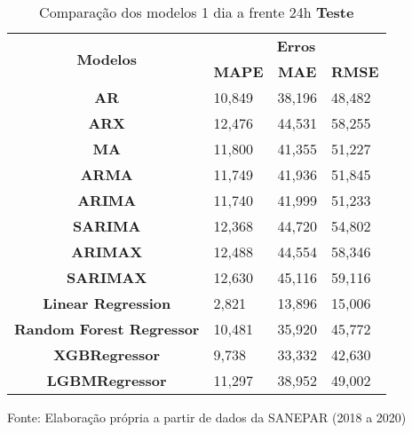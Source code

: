 \begin{table}[H]
	\centering
	\caption{Comparação dos modelos 1 dia a frente 24h \textbf{Teste} }\label{tb:1-24tst}
	\begin{tabular}{@{}clll@{}}
		\toprule
		\multirow{2}{*}{\textbf{Modelos}} & \multicolumn{3}{c}{\textbf{Erros}}                                                                       \\ \cmidrule(l){2-4} 
		& \multicolumn{1}{c}{\textbf{MAPE}} & \multicolumn{1}{c}{\textbf{MAE}} & \multicolumn{1}{c}{\textbf{RMSE}} \\ \hline
\textbf{AR}                       & 10,849                            & 38,196                           & 48,482                            \\
\textbf{ARX}                      & 12,476                            & 44,531                           & 58,255                            \\
\textbf{MA}                       & 11,800                            & 41,355                           & 51,227                            \\
\textbf{ARMA}                     & 11,749                            & 41,936                           & 51,845                            \\
\textbf{ARIMA}                    & 11,740                            & 41,999                           & 51,233                            \\
\textbf{SARIMA}                   & 12,368                            & 44,720                           & 54,802                            \\
\textbf{ARIMAX}                   & 12,488                            & 44,554                           & 58,346                            \\
\textbf{SARIMAX}                  & 12,630                            & 45,116                           & 59,116                            \\
\textbf{Linear Regression}        & 2,821                             & 13,896                           & 15,006                            \\
\textbf{Random Forest Regressor}  & 10,481                            & 35,920                           & 45,772                            \\
\textbf{XGBRegressor}             & 9,738                             & 33,332                           & 42,630                            \\
\textbf{LGBMRegressor}            & 11,297                            & 38,952                           & 49,002                            \\ \bottomrule
	\end{tabular}

Fonte: Elaboração própria a partir de dados da SANEPAR (2018 a 2020)
\end{table}

